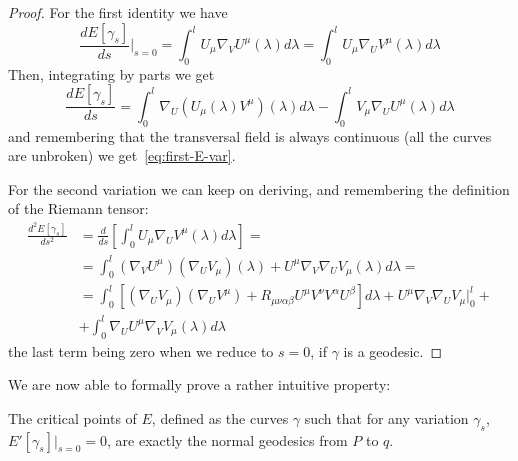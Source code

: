 \begin{proof}
	For the first identity we have
	\begin{equation*}
		\frac{dE[\gamma_s]}{ds}\Big\vert_{s = 0}  = \int_{0}^{l} U_{\mu}\nabla_VU^{\mu}(\lambda) d\lambda = \int_{0}^{l} U_{\mu}\nabla_UV^{\mu}(\lambda) d\lambda
	\end{equation*}
Then, integrating by parts we get 
\begin{equation*}
	\frac{dE[\gamma_s]}{ds} = \int_{0}^{l} \nabla_U\left(U_{\mu}(\lambda)V^{\mu}\right)(\lambda) d\lambda - \int_{0}^{l} V_{\mu}\nabla_UU^{\mu}(\lambda) d\lambda
\end{equation*}
 and remembering that the transversal field is always continuous (all the curves are unbroken) we get~\eqref{eq:first-E-var}.
 
 For the second variation we can keep on deriving, and remembering the definition of the Riemann tensor:
 \begin{align*}
 	\frac{d^2E[\gamma_s]}{ds^2} &= \frac{d}{ds} \left[\int_{0}^{l} U_{\mu}\nabla_UV^{\mu}(\lambda) d\lambda\right] = \\
 	&= \int_{0}^{l} (\nabla_VU^{\mu})(\nabla_UV_{\mu})(\lambda) + U^{\mu} \nabla_V\nabla_UV_{\mu} (\lambda) d\lambda=\\
 	&= \int_{0}^{l} \left[(\nabla_UV_{\mu})(\nabla_UV^{\mu}) + R_{\mu\nu\alpha\beta}U^{\mu}V^{\nu}V^{\alpha}U^{\beta}\right] d\lambda + U^{\mu} \nabla_V\nabla_UV_{\mu} \Big\vert_0^l +\\
 	&+  \int_{0}^{l} \nabla_UU^{\mu} \nabla_VV_{\mu} (\lambda) d\lambda
 \end{align*}
	the last term being zero when we reduce to \(s = 0\), if \(\gamma\) is a geodesic.

\end{proof}
We are now able to formally prove a rather intuitive property:
\begin{prop}
	\label{prop:perp-critical-gamma}
	The critical points of \(E\), defined as the curves \(\gamma\) such that for any variation \(\gamma_s\), \(E'[\gamma_s]\Big\vert_{s = 0} = 0\), are exactly the normal geodesics from \(P\) to \(q\).
\end{prop}
